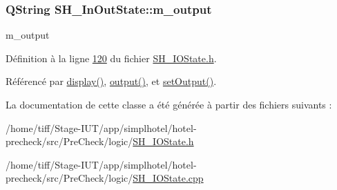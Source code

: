 \hypertarget{classSH__InOutState_ae735e741ce229d2600448d8daa0abc2d}{
\subsubsection[{m\-\_\-output}]{\setlength{\rightskip}{0pt plus 5cm}Q\-String S\-H\-\_\-\-In\-Out\-State\-::m\-\_\-output\hspace{0.3cm}{\ttfamily [private]}}}\label{classSH__InOutState_ae735e741ce229d2600448d8daa0abc2d}


m\-\_\-output 



Définition à la ligne \hyperlink{SH__IOState_8h_source_l00120}{120} du fichier \hyperlink{SH__IOState_8h_source}{S\-H\-\_\-\-I\-O\-State.\-h}.



Référencé par \hyperlink{classSH__InOutState_a918e8a7f5fe00dc16004e46eeee1281d}{display()}, \hyperlink{classSH__InOutState_a1a2fd4f34484125058e20730aaee7e46}{output()}, et \hyperlink{classSH__InOutState_a7dc244d72e09fdbc30eb3a704b05a4d8}{set\-Output()}.



La documentation de cette classe a été générée à partir des fichiers suivants \-:\begin{DoxyCompactItemize}
\item 
/home/tiff/\-Stage-\/\-I\-U\-T/app/simplhotel/hotel-\/precheck/src/\-Pre\-Check/logic/\hyperlink{SH__IOState_8h}{S\-H\-\_\-\-I\-O\-State.\-h}\item 
/home/tiff/\-Stage-\/\-I\-U\-T/app/simplhotel/hotel-\/precheck/src/\-Pre\-Check/logic/\hyperlink{SH__IOState_8cpp}{S\-H\-\_\-\-I\-O\-State.\-cpp}\end{DoxyCompactItemize}
